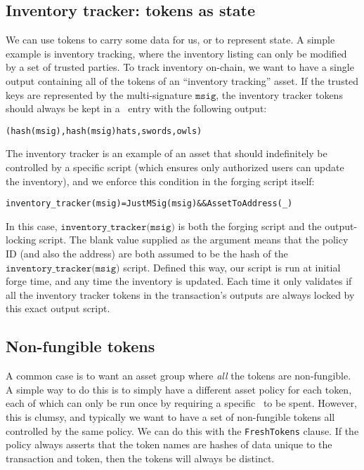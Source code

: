 \subsection{Inventory tracker: tokens as state}

We can use tokens to carry some data for us, or to represent state.
A simple example is inventory tracking, where the inventory listing can only be modified by a set of trusted parties.
To track inventory on-chain, we want to have a single output containing all of the tokens of an ``inventory tracking'' asset.
If the trusted keys are represented by the multi-signature $\texttt{msig}$, the inventory tracker tokens should always be kept in a \UTXO\ entry with the following output:
\begin{alltt}
  (hash(msig) , \cL{}hash(msig) \mapsTo \cL{}hats , swords , owls \cR\cR)
\end{alltt}

The inventory tracker is
an example of an asset that should indefinitely be controlled by a specific script
(which ensures only authorized users can update the inventory), and
we enforce this condition in the forging script itself:

\begin{alltt}
  inventory_tracker(msig) = JustMSig(msig) && AssetToAddress(_)
\end{alltt}

In this case, $\texttt{inventory\_tracker(msig)}$ is both the forging
script and the output-locking script. The blank value supplied as the
argument means that the policy ID (and also the address) are both
assumed to be the hash of the $\texttt{inventory\_tracker(msig)}$
script.
Defined this way, our script is run at initial forge time, and any time
the inventory is updated. Each time
it only validates if all the inventory tracker tokens in the transaction's
outputs are always locked by this exact output script.

\subsection{Non-fungible tokens}

A common case is to want an asset group where \emph{all} the tokens are non-fungible.
A simple way to do this is to simply have a different asset policy for each token, each of which can only be run once by requiring a specific \UTXO\ to be spent. However, this is clumsy, and typically we want to have a set of non-fungible tokens all controlled by the same policy. We can do this with the \texttt{FreshTokens} clause.
If the policy always asserts that the token names are hashes of data unique to the transaction and token, then the tokens will always be distinct.

